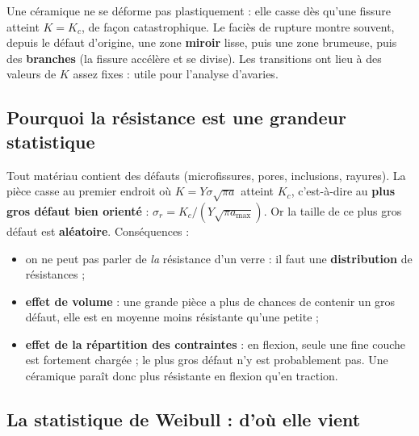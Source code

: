 Une céramique ne se déforme pas plastiquement : elle casse dès qu'une fissure atteint
$K = K_c$, de façon catastrophique. Le faciès de rupture montre souvent, depuis le défaut
d'origine, une zone \textbf{miroir} lisse, puis une zone brumeuse, puis des \textbf{branches}
(la fissure accélère et se divise). Les transitions ont lieu à des valeurs de $K$ assez fixes :
utile pour l'analyse d'avaries.


\subsection*{Pourquoi la résistance est une grandeur statistique}

Tout matériau contient des défauts (microfissures, pores, inclusions, rayures). La pièce casse
au premier endroit où $K = Y\sigma\sqrt{\pi a}$ atteint $K_c$, c'est-à-dire au \textbf{plus gros
défaut bien orienté} : $\sigma_r = K_c/(Y\sqrt{\pi a_{\max}})$. Or la taille de ce plus gros
défaut est \textbf{aléatoire}. Conséquences :
\begin{itemize}
  \item on ne peut pas parler de \og \emph{la}\fg{} résistance d'un verre : il faut une
        \textbf{distribution} de résistances ;
  \item \textbf{effet de volume} : une grande pièce a plus de chances de contenir un gros
        défaut, elle est en moyenne moins résistante qu'une petite ;
  \item \textbf{effet de la répartition des contraintes} : en flexion, seule une fine couche est
        fortement chargée ; le plus gros défaut n'y est probablement pas. Une céramique paraît donc
        plus résistante en flexion qu'en traction.
\end{itemize}


\subsection*{La statistique de Weibull : d'où elle vient}


